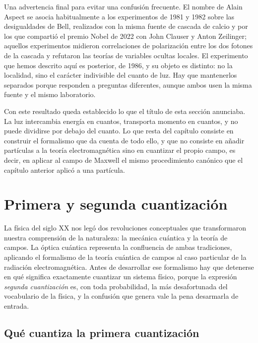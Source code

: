             Una advertencia final para evitar una confusión frecuente. El nombre de Alain Aspect se asocia habitualmente a los experimentos de 1981 y 1982 sobre las desigualdades de Bell, realizados con la misma fuente de cascada de calcio y por los que compartió el premio Nobel de 2022 con John Clauser y Anton Zeilinger; aquellos experimentos midieron correlaciones de polarización entre los dos fotones de la cascada y refutaron las teorías de variables ocultas locales. El experimento que hemos descrito aquí es posterior, de 1986, y su objeto es distinto: no la localidad, sino el carácter indivisible del cuanto de luz. Hay que mantenerlos separados porque responden a preguntas diferentes, aunque ambos usen la misma fuente y el mismo laboratorio.

            Con este resultado queda establecido lo que el título de esta sección anunciaba. La luz intercambia energía en cuantos, transporta momento en cuantos, y no puede dividirse por debajo del cuanto. Lo que resta del capítulo consiste en construir el formalismo que da cuenta de todo ello, y que no consiste en añadir partículas a la teoría electromagnética sino en cuantizar el propio campo, es decir, en aplicar al campo de Maxwell el mismo procedimiento canónico que el capítulo anterior aplicó a una partícula.

\section{Primera y segunda cuantización}

    La física del siglo XX nos legó dos revoluciones conceptuales que transformaron nuestra comprensión de la naturaleza: la mecánica cuántica y la teoría de campos. La óptica cuántica representa la confluencia de ambas tradiciones, aplicando el formalismo de la teoría cuántica de campos al caso particular de la radiación electromagnética. Antes de desarrollar ese formalismo hay que detenerse en qué significa exactamente cuantizar un sistema físico, porque la expresión \textit{segunda cuantización} es, con toda probabilidad, la más desafortunada del vocabulario de la física, y la confusión que genera vale la pena desarmarla de entrada.

    \subsection{Qué cuantiza la primera cuantización}

